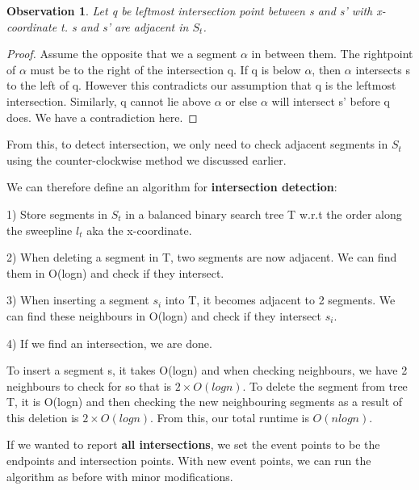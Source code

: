\documentclass[11pt, oneside]{article}
\newtheorem{observation}[theorem]{\textbf{Observation}}
\theoremstyle{definition}
\begin{document}
\begin{observation}
  Let q be leftmost intersection point between s and s' with x-coordinate t. s and s' are adjacent in $S_t$.
\end{observation}
\begin{proof}
  Assume the opposite that we a segment $\alpha$ in between them. The rightpoint of $\alpha$ must be to the right of the intersection q. If q is below $\alpha$, then $\alpha$ intersects s to the left of q. However this contradicts our assumption that q is the leftmost intersection. Similarly, q cannot lie above $\alpha$ or else $\alpha$ will intersect s' before q does. We have a contradiction here.
\end{proof}

From this, to detect intersection, we only need to check adjacent segments in $S_t$ using the counter-clockwise method we discussed earlier.

We can therefore define an algorithm for \textbf{intersection detection}:
\begin{center}
  1) Store segments in $S_t$ in a balanced binary search tree T w.r.t the order along the sweepline $l_t$ aka the x-coordinate.

  2) When deleting a segment in T, two segments are now adjacent. We can find them in O(logn) and check if they intersect.

  3) When inserting a segment $s_i$ into T, it becomes adjacent to 2 segments. We can find these neighbours in O(logn) and check if they intersect $s_i$.

  4) If we find an intersection, we are done.
\end{center}

To insert a segment s, it takes O(logn) and when checking neighbours, we have 2 neighbours to check for so that is $2 \times O(logn)$. To delete the segment from tree T, it is O(logn) and then checking the new neighbouring segments as a result of this deletion is $2 \times O(logn)$. From this, our total runtime is $O(nlogn)$.

If we wanted to report \textbf{all intersections}, we set the event points to be the endpoints and intersection points. With new event points, we can run the algorithm as before with minor modifications.
\end{document}
